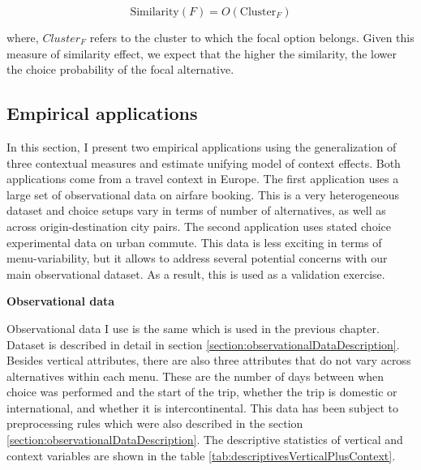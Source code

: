 \documentclass[a4paper,12pt]{article}
\begin{document}
 $$\text{Similarity}(F) = O(\text{Cluster}_F)
$$

where, $Cluster_F$ refers to the cluster to which the focal option belongs. Given this measure of similarity effect, we expect that the higher the similarity, the lower the choice probability of the focal alternative.

\subsection{Empirical applications}

In this section, I present two empirical applications using the generalization of three contextual measures and estimate unifying model of context effects. Both applications come from a travel context in Europe. The first application uses a large set of observational data on airfare booking. This is a very heterogeneous dataset and choice setups vary in terms of number of alternatives, as well as across origin-destination city pairs. The second application uses stated choice experimental data on urban commute. This data is less exciting in terms of menu-variability, but it allows to address several potential concerns with our main observational dataset. As a result, this is used as a validation exercise. 

\textbf{Observational data}\label{section:additionalPreprocessingObservationalData}

Observational data I use is the same which is used in the previous chapter. Dataset is described in detail in section \ref{section:observationalDataDescription}. Besides vertical attributes, there are also  three attributes that do not vary across alternatives within each menu. These are the number of days between when choice was performed and the start of the trip, whether the trip is domestic or international, and whether it is intercontinental. This data has been subject to preprocessing rules which were also described in the section \ref{section:observationalDataDescription}. The descriptive statistics of vertical and context variables are shown in the table \ref{tab:descriptivesVerticalPlusContext}.
\end{document}
